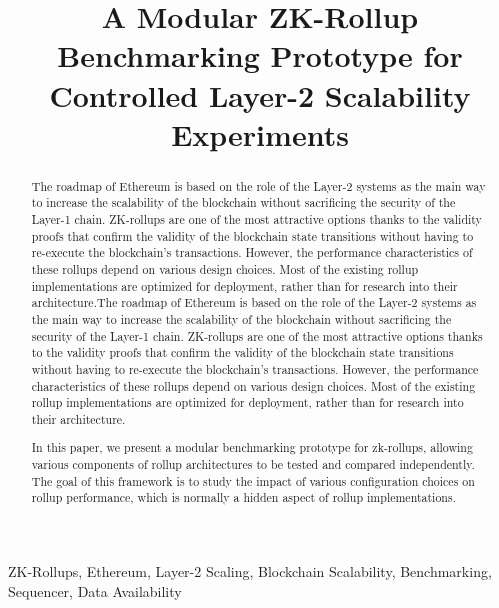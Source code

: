 \documentclass[conference]{IEEEtran}
\begin{document}
\title{A Modular ZK-Rollup Benchmarking Prototype for Controlled Layer-2 Scalability Experiments}



\maketitle

\thispagestyle{plain}
\pagestyle{plain}

\begin{abstract}
The roadmap of Ethereum is based on the role of the Layer-2 systems as the main way to increase the scalability of the blockchain without sacrificing the security of the Layer-1 chain. ZK-rollups are one of the most attractive options thanks to the validity proofs that confirm the validity of the blockchain state transitions without having to re-execute the blockchain’s transactions. However, the performance characteristics of these rollups depend on various design choices. Most of the existing rollup implementations are optimized for deployment, rather than for research into their architecture.The roadmap of Ethereum is based on the role of the Layer-2 systems as the main way to increase the scalability of the blockchain without sacrificing the security of the Layer-1 chain. ZK-rollups are one of the most attractive options thanks to the validity proofs that confirm the validity of the blockchain state transitions without having to re-execute the blockchain’s transactions. However, the performance characteristics of these rollups depend on various design choices. Most of the existing rollup implementations are optimized for deployment, rather than for research into their architecture.

In this paper, we present a modular benchmarking prototype for zk-rollups, allowing various components of rollup architectures to be tested and compared independently. The goal of this framework is to study the impact of various configuration choices on rollup performance, which is normally a hidden aspect of rollup implementations.
\end{abstract}

\begin{IEEEkeywords}
ZK-Rollups, Ethereum, Layer-2 Scaling, Blockchain Scalability, Benchmarking, Sequencer, Data Availability
\end{IEEEkeywords}


\vspace{0.4cm}

\vspace{0.4cm}

\vspace{0.4cm}

\vspace{0.4cm}

\vspace{0.4cm}




\end{document}
